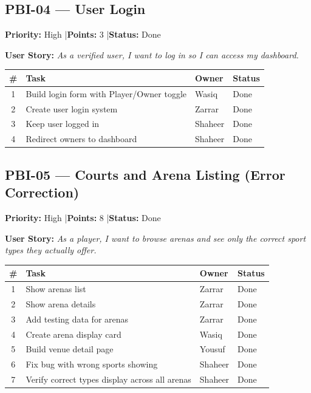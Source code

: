 \documentclass[12pt,a4paper]{article}
\begin{document}
\vspace{1.5em}

\subsection*{PBI-04 --- User Login}
\textbf{Priority:} High \quad|\quad \textbf{Points:} 3 \quad|\quad \textbf{Status:} Done

\vspace{0.3em}
\textbf{User Story:} \textit{As a verified user, I want to log in so I can access my dashboard.}

\vspace{0.5em}
\noindent\renewcommand{\arraystretch}{1.3}
\begin{tabularx}{\textwidth}{|c|X|l|l|}
\hline
\rowcolor{headerbg}\color{white}\bfseries \# & \color{white}\bfseries Task & \color{white}\bfseries Owner & \color{white}\bfseries Status \\ \hline
1 & Build login form with Player/Owner toggle & Wasiq & Done \\ \hline
\rowcolor{rowgray} 2 & Create user login system & Zarrar & Done \\ \hline
3 & Keep user logged in & Shaheer & Done \\ \hline
\rowcolor{rowgray} 4 & Redirect owners to dashboard & Shaheer & Done \\ \hline
\end{tabularx}

\newpage

\subsection*{PBI-05 --- Courts and Arena Listing (Error Correction)}
\textbf{Priority:} High \quad|\quad \textbf{Points:} 8 \quad|\quad \textbf{Status:} Done

\vspace{0.3em}
\textbf{User Story:} \textit{As a player, I want to browse arenas and see only the correct sport types they actually offer.}

\vspace{0.5em}
\noindent\renewcommand{\arraystretch}{1.3}
\begin{tabularx}{\textwidth}{|c|X|l|l|}
\hline
\rowcolor{headerbg}\color{white}\bfseries \# & \color{white}\bfseries Task & \color{white}\bfseries Owner & \color{white}\bfseries Status \\ \hline
1 & Show arenas list & Zarrar & Done \\ \hline
\rowcolor{rowgray} 2 & Show arena details & Zarrar & Done \\ \hline
3 & Add testing data for arenas & Zarrar & Done \\ \hline
\rowcolor{rowgray} 4 & Create arena display card & Wasiq & Done \\ \hline
5 & Build venue detail page & Yousuf & Done \\ \hline
\rowcolor{rowgray} 6 & Fix bug with wrong sports showing & Shaheer & Done \\ \hline
7 & Verify correct types display across all arenas & Shaheer & Done \\ \hline
\end{tabularx}
\end{document}
